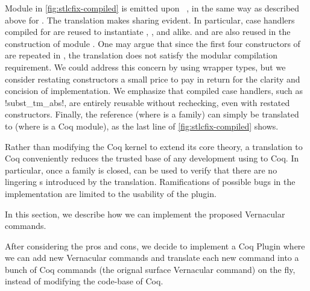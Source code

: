 Module  in \cref{fig:stlcfix-compiled} is emitted upon
~, in the same way as described above for .
The translation makes sharing evident.
In particular, case handlers compiled for 
are reused to instantiate , , and alike.
 and 
are also reused in the construction of module .
%
One may argue that since the first four constructors of  are
repeated in , the translation does not satisfy the
modular compilation requirement.
We could address this concern by using wrapper types,
but we consider restating constructors a small price to pay in return
for the clarity and concision of implementation.
We emphasize that compiled case handlers, such as \lsti!subst\_tm_abs!,
are entirely reusable without rechecking, even with restated constructors.
%
Finally, the reference  (where  is a family)
can simply be translated to  (where  is a Coq module),
as the last line of \cref{fig:stlcfix-compiled} shows.


Rather than modifying the Coq kernel to extend its core theory, a translation to
Coq conveniently reduces the trusted base of any development using \Lang to Coq.
In particular, once a family is closed,  can be used
to verify that there are no lingering s introduced by the translation.
Ramifications of possible bugs in the \Lang implementation are limited to
the usability of the plugin.

\ifShowOldWriting

\newpage

In this section, we describe how we can implement the proposed Vernacular commands.

After considering the pros and cons, we decide to implement a Coq Plugin where we can add new Vernacular commands and translate each new command into a bunch of Coq commands (the orignal surface Vernacular command) on the fly, instead of modifying the code-base of Coq. 


